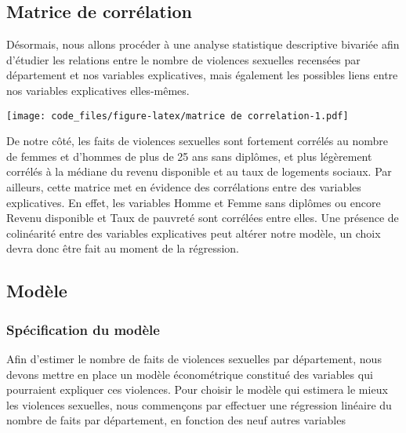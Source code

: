 \documentclass[
]{article}
\begin{document}
\hypertarget{matrice-de-corruxe9lation}{%
\subsection{Matrice de corrélation}\label{matrice-de-corruxe9lation}}

Désormais, nous allons procéder à une analyse statistique descriptive
bivariée afin d'étudier les relations entre le nombre de violences
sexuelles recensées par département et nos variables explicatives, mais
également les possibles liens entre nos variables explicatives
elles-mêmes.

\texttt{[image: code\_files/figure-latex/matrice de correlation-1.pdf]}

De notre côté, les faits de violences sexuelles sont fortement corrélés
au nombre de femmes et d'hommes de plus de 25 ans sans diplômes, et plus
légèrement corrélés à la médiane du revenu disponible et au taux de
logements sociaux. Par ailleurs, cette matrice met en évidence des
corrélations entre des variables explicatives. En effet, les variables
Homme et Femme sans diplômes ou encore Revenu disponible et Taux de
pauvreté sont corrélées entre elles. Une présence de colinéarité entre
des variables explicatives peut altérer notre modèle, un choix devra
donc être fait au moment de la régression.

\hypertarget{moduxe8le}{%
\subsection{Modèle}\label{moduxe8le}}

\hypertarget{spuxe9cification-du-moduxe8le}{%
\subsubsection{Spécification du
modèle}\label{spuxe9cification-du-moduxe8le}}

Afin d'estimer le nombre de faits de violences sexuelles par
département, nous devons mettre en place un modèle économétrique
constitué des variables qui pourraient expliquer ces violences. Pour
choisir le modèle qui estimera le mieux les violences sexuelles, nous
commençons par effectuer une régression linéaire du nombre de faits par
département, en fonction des neuf autres variables
\end{document}
